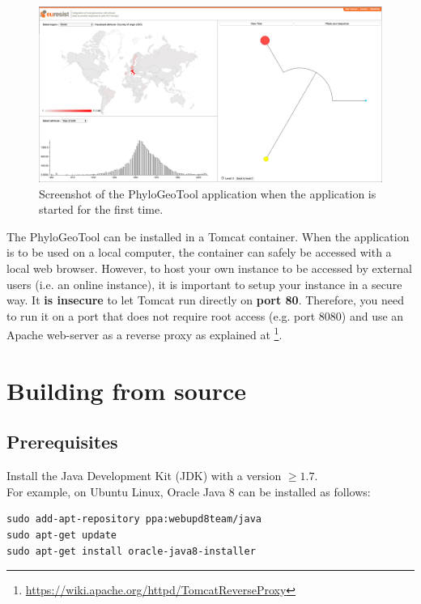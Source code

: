 \documentclass[a4paper, 11pt]{article} %
\begin{document}
\begin{figure}[!htbp]
\includegraphics[scale=0.19]{images/defaultScreenshot.png}\vspace{-0.9cm}
\caption{Screenshot of the PhyloGeoTool application when the application is started for the first time.}
\label{fig:01} 
\end{figure}

The PhyloGeoTool can be installed in a Tomcat container. When the application is to be used on a local computer, the container can safely be accessed with a local web browser. However, to host your own instance to be accessed by external users (i.e. an online instance), it is important to setup your instance in a secure way.
It \textbf{is insecure} to let Tomcat run directly on \textbf{port 80}. Therefore, you need to run it on a port that does not require root access (e.g. port 8080) and use an Apache web-server as a reverse proxy as explained at \footnote{\url{https://wiki.apache.org/httpd/TomcatReverseProxy}}. 

\section{Building from source}
\label{sec:source}

\subsection{Prerequisites}
Install the Java Development Kit (JDK) with a version $\geq 1.7$.\\

\noindent For example, on Ubuntu Linux, Oracle Java 8 can be installed as follows:
\begin{verbatim} 
sudo add-apt-repository ppa:webupd8team/java
sudo apt-get update
sudo apt-get install oracle-java8-installer
\end{verbatim}
\end{document}
